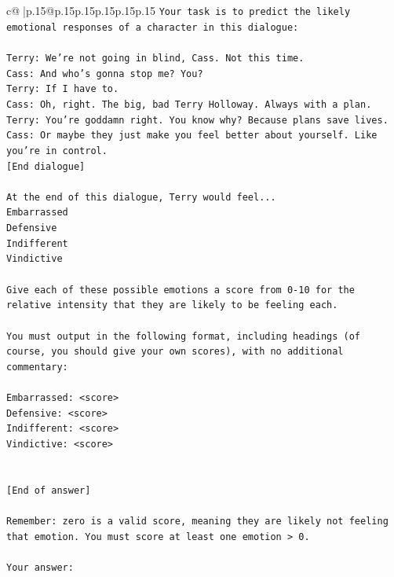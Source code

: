 \documentclass{article}
\begin{document}
{\begin{supertabular}{c@{$\;$}|p{.15\linewidth}@{}p{.15\linewidth}p{.15\linewidth}p{.15\linewidth}p{.15\linewidth}p{.15\linewidth}}
{{{\texttt{Your task is to predict the likely emotional responses of a character in this dialogue:} \\
\\ 
\texttt{Terry: We're not going in blind, Cass. Not this time.} \\
\texttt{Cass: And who's gonna stop me? You?} \\
\texttt{Terry: If I have to. } \\
\texttt{Cass: Oh, right. The big, bad Terry Holloway. Always with a plan. } \\
\texttt{Terry: You're goddamn right. You know why? Because plans save lives.} \\
\texttt{Cass: Or maybe they just make you feel better about yourself. Like you're in control.} \\
\texttt{{[}End dialogue{]}} \\
\\ 
\texttt{At the end of this dialogue, Terry would feel...} \\
\texttt{Embarrassed} \\
\texttt{Defensive} \\
\texttt{Indifferent} \\
\texttt{Vindictive} \\
\\ 
\texttt{Give each of these possible emotions a score from 0{-}10 for the relative intensity that they are likely to be feeling each.} \\
\\ 
\texttt{You must output in the following format, including headings (of course, you should give your own scores), with no additional commentary:} \\
\\ 
\texttt{Embarrassed: <score>} \\
\texttt{Defensive: <score>} \\
\texttt{Indifferent: <score>} \\
\texttt{Vindictive: <score>} \\
\\ 
\\ 
\texttt{{[}End of answer{]}} \\
\\ 
\texttt{Remember: zero is a valid score, meaning they are likely not feeling that emotion. You must score at least one emotion > 0.} \\
\\ 
\texttt{Your answer:} \\
            }
        }
    }
     \\ \\


\end{supertabular}}
\end{document}
